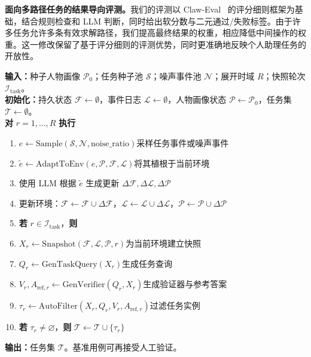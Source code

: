 \documentclass[10pt]{article}
\begin{document}
\textbf{面向多路径任务的结果导向评测。}我们的评测以 Claw-Eval~\citep{claweval} 的评分细则框架为基础，结合规则检查和 LLM 判断，同时给出软分数与二元通过/失败标签。由于许多任务允许多条有效求解路径，我们提高最终结果的权重，相应降低中间操作的权重。这一修改保留了基于评分细则的评测优势，同时更准确地反映个人助理任务的开放性。

\begin{algorithm}[t]
  \caption{自动化任务生成流水线。}
  \label{alg:algo}
  \small
  \textbf{输入：}种子人物画像 $\mathcal{P}_0$；任务种子池 $\mathcal{S}$；噪声事件池 $\mathcal{N}$；展开时域 $R$；快照轮次 $\mathcal{I}_{\mathrm{task}}$。\\
  \textbf{初始化：}持久状态 $\mathcal{F}\!\leftarrow\!\emptyset$，事件日志 $\mathcal{L}\!\leftarrow\!\emptyset$，人物画像状态 $\mathcal{P}\!\leftarrow\!\mathcal{P}_0$，任务集 $\mathcal{T}\!\leftarrow\!\emptyset$。\\
  \textbf{对} $r=1,\dots,R$ \textbf{执行}
  \begin{enumerate}[leftmargin=1.8em,itemsep=0.1em]
    \item $e\!\leftarrow\!\mathrm{Sample}(\mathcal{S},\mathcal{N},\mathrm{noise\_ratio})$\hfill 采样任务事件或噪声事件
    \item $\tilde{e}\!\leftarrow\!\mathrm{AdaptToEnv}(e,\mathcal{P},\mathcal{F},\mathcal{L})$\hfill 将其植根于当前环境
    \item 使用 LLM 根据 $\tilde{e}$ 生成更新 $\Delta\mathcal{F},\Delta\mathcal{L},\Delta\mathcal{P}$
    \item 更新环境：$\mathcal{F}\!\leftarrow\!\mathcal{F}\cup\Delta\mathcal{F}$，$\mathcal{L}\!\leftarrow\!\mathcal{L}\cup\Delta\mathcal{L}$，$\mathcal{P}\!\leftarrow\!\mathcal{P}\cup\Delta\mathcal{P}$
    \item \textbf{若} $r\in\mathcal{I}_{\mathrm{task}}$，\textbf{则}
    \item[] \hspace*{1em}$X_r\!\leftarrow\!\mathrm{Snapshot}(\mathcal{F},\mathcal{L},\mathcal{P},r)$\hfill 为当前环境建立快照
    \item[] \hspace*{1em}$Q_r\!\leftarrow\!\mathrm{GenTaskQuery}(X_r)$\hfill 生成任务查询
    \item[] \hspace*{1em}$V_r,A_{\mathrm{ref},r}\!\leftarrow\!\mathrm{GenVerifier}(Q_r,X_r)$\hfill 生成验证器与参考答案
    \item[] \hspace*{1em}$\tau_r\!\leftarrow\!\mathrm{AutoFilter}(X_r,Q_r,V_r,A_{\mathrm{ref},r})$\hfill 过滤任务实例
    \item[] \hspace*{1em}\textbf{若} $\tau_r\neq\varnothing$，\textbf{则} $\mathcal{T}\!\leftarrow\!\mathcal{T}\cup\{\tau_r\}$
  \end{enumerate}
  \textbf{输出：}任务集 $\mathcal{T}$。\hfill 基准用例可再接受人工验证。\\
\end{algorithm}
\end{document}
